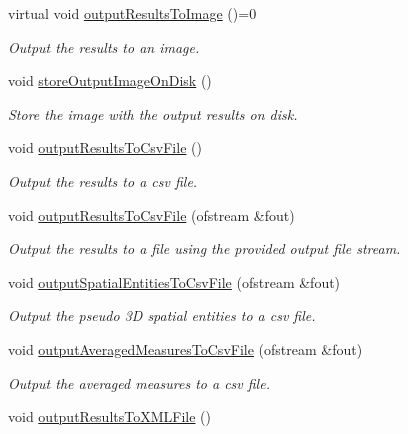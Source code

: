 \begin{DoxyCompactItemize}
virtual void \hyperlink{classmultiscale_1_1analysis_1_1Detector_a5d10b68605d5a1711527b4b896b3b2cc}{output\-Results\-To\-Image} ()=0
\begin{DoxyCompactList}\small\item\em \-Output the results to an image. \end{DoxyCompactList}\item 
void \hyperlink{classmultiscale_1_1analysis_1_1Detector_aa15a7546c4f8f77fcf85632386a4c5d5}{store\-Output\-Image\-On\-Disk} ()
\begin{DoxyCompactList}\small\item\em \-Store the image with the output results on disk. \end{DoxyCompactList}\item 
void \hyperlink{classmultiscale_1_1analysis_1_1Detector_a2055dc183dd3601d9979bc99a3222eb4}{output\-Results\-To\-Csv\-File} ()
\begin{DoxyCompactList}\small\item\em \-Output the results to a csv file. \end{DoxyCompactList}\item 
void \hyperlink{classmultiscale_1_1analysis_1_1Detector_a8f77ceb1535be09ef149aedcd6b1a84e}{output\-Results\-To\-Csv\-File} (ofstream \&fout)
\begin{DoxyCompactList}\small\item\em \-Output the results to a file using the provided output file stream. \end{DoxyCompactList}\item 
void \hyperlink{classmultiscale_1_1analysis_1_1Detector_a64d541cd53a16dc5f204413820c6b0ef}{output\-Spatial\-Entities\-To\-Csv\-File} (ofstream \&fout)
\begin{DoxyCompactList}\small\item\em \-Output the pseudo 3\-D spatial entities to a csv file. \end{DoxyCompactList}\item 
void \hyperlink{classmultiscale_1_1analysis_1_1Detector_a3f4f3192d392f26e324ef9760820d904}{output\-Averaged\-Measures\-To\-Csv\-File} (ofstream \&fout)
\begin{DoxyCompactList}\small\item\em \-Output the averaged measures to a csv file. \end{DoxyCompactList}\item 
void \hyperlink{classmultiscale_1_1analysis_1_1Detector_a574c1c58c9e0bab3d224e5b0a77e410a}{output\-Results\-To\-X\-M\-L\-File} ()

\end{DoxyCompactItemize}
